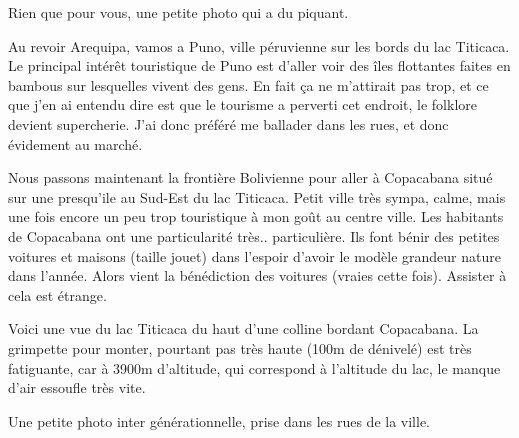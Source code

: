 \begin{multicols}{2}

Rien que pour vous, une petite photo qui a du piquant.


Au revoir Arequipa, vamos a Puno, ville péruvienne sur les bords du lac Titicaca. Le principal intérêt touristique de Puno est d'aller voir des îles flottantes faites en bambous sur lesquelles vivent des gens. En fait ça ne m'attirait pas trop, et ce que j'en ai entendu dire est que le tourisme a perverti cet endroit, le folklore devient supercherie. J'ai donc préféré me ballader dans les rues, et donc évidement au marché.


Nous passons maintenant la frontière Bolivienne pour aller à Copacabana situé sur une presqu'ile au Sud-Est du lac Titicaca. Petit ville très sympa, calme, mais une fois encore un peu trop touristique à mon goût au centre ville. Les habitants de Copacabana ont une particularité très.. particulière. Ils font bénir des petites voitures et maisons (taille jouet) dans l'espoir d'avoir le modèle grandeur nature dans l'année. Alors vient la bénédiction des voitures (vraies cette fois). Assister à cela est étrange.


Voici une vue du lac Titicaca du haut d'une colline bordant Copacabana. La grimpette pour monter, pourtant pas très haute (100m de dénivelé) est très fatiguante, car à 3900m d'altitude, qui correspond à l'altitude du lac, le manque d'air essoufle très vite.


Une petite photo inter générationnelle, prise dans les rues de la ville.


\end{multicols}
